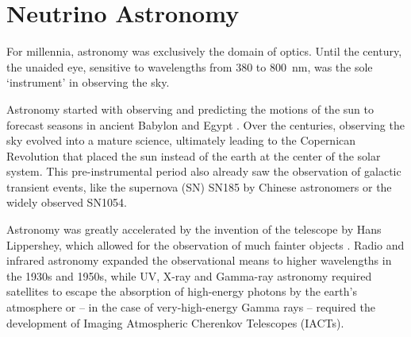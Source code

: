 \documentclass[
    a4paper, %
    fontsize=10pt, %
    twoside=false, %
    numbers=noenddot, %
    fontmethod=tex,
]{kaobook}
\begin{document}

\tableofcontents
\listoffigures

\let\cleardoublepage\bigskip
\let\clearpage\bigskip

\listoftables

\endgroup

\mainmatter
{}





\chapter{Neutrino Astronomy} \label{theory}

For millennia, astronomy was exclusively the domain of optics. Until the  century, the unaided eye, sensitive to wavelengths from \num{380} to \SI{800}{\nano\m}, was the sole `instrument'  in observing the sky.

Astronomy started with observing and predicting the motions of the sun to forecast seasons in ancient Babylon and Egypt . Over the centuries, observing the sky evolved into a mature science, ultimately leading to the Copernican Revolution that placed the sun instead of the earth at the center of the solar system. This pre-instrumental period also already saw the observation of galactic transient events, like the supernova (SN) SN185 by Chinese astronomers or the widely observed SN1054.

Astronomy was greatly accelerated by the invention of the telescope by Hans Lippershey, which allowed for the observation of much fainter objects . Radio and infrared astronomy expanded the observational means to higher wavelengths in the 1930s and 1950s, while UV, X-ray and Gamma-ray astronomy required satellites to escape the absorption of high-energy photons by the earth's atmosphere or -- in the case of very-high-energy Gamma rays -- required the development of Imaging Atmospheric Cherenkov Telescopes (IACTs).
\end{document}
